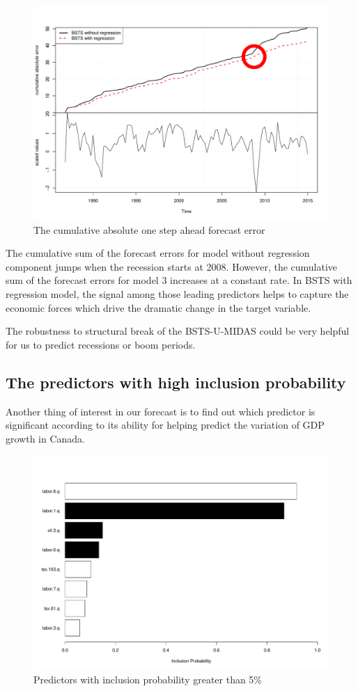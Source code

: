 \begin{figure}[ht]
	\centering
	\includegraphics[width=0.6\linewidth]{Figures/cumulative_errors}
	\caption{The cumulative absolute one step ahead forecast error}
	\label{fig:cumulative_errors}
\end{figure}


The cumulative sum of the forecast errors for model without regression component jumps when the recession starts at 2008. However, the cumulative sum of the forecast errors for model 3 increases at a constant rate. In BSTS with regression model, the signal among those leading predictors helps to capture the economic forces which drive the dramatic change in the target variable.  

The robustness to structural break of the BSTS-U-MIDAS could be very helpful for us to predict recessions or boom periods. 

\subsection{The predictors with high inclusion probability}

Another thing of interest in our forecast  is to find out which predictor is significant according to its ability for helping predict the variation of GDP growth in Canada.


\begin{figure}[ht]
	\centering
	\includegraphics[width=0.6\linewidth]{Figures/Coefficients}
	\caption{Predictors with inclusion probability greater than 5\%}
	\label{fig:Coefficients}
\end{figure}



